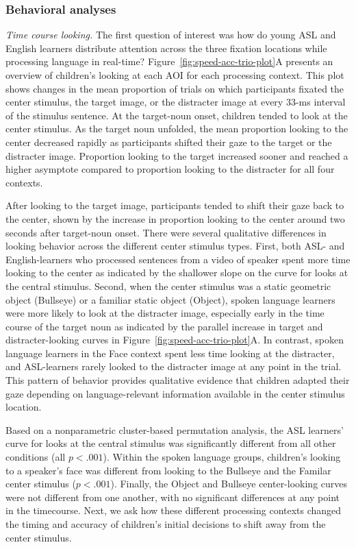 \documentclass[,man,floatsintext]{apa6}
\begin{document}
\hypertarget{behavioral-analyses}{%
\subsubsection{Behavioral analyses}\label{behavioral-analyses}}

\emph{Time course looking.} The first question of interest was how do young ASL and English learners distribute attention across the three fixation locations while processing language in real-time? Figure~\ref{fig:speed-acc-trio-plot}A presents an overview of children's looking at each AOI for each processing context. This plot shows changes in the mean proportion of trials on which participants fixated the center stimulus, the target image, or the distracter image at every 33-ms interval of the stimulus sentence. At the target-noun onset, children tended to look at the center stimulus. As the target noun unfolded, the mean proportion looking to the center decreased rapidly as participants shifted their gaze to the target or the distracter image. Proportion looking to the target increased sooner and reached a higher asymptote compared to proportion looking to the distracter for all four contexts.

After looking to the target image, participants tended to shift their gaze back to the center, shown by the increase in proportion looking to the center around two seconds after target-noun onset. There were several qualitative differences in looking behavior across the different center stimulus types. First, both ASL- and English-learners who processed sentences from a video of speaker spent more time looking to the center as indicated by the shallower slope on the curve for looks at the central stimulus. Second, when the center stimulus was a static geometric object (Bullseye) or a familiar static object (Object), spoken language learners were more likely to look at the distracter image, especially early in the time course of the target noun as indicated by the parallel increase in target and distracter-looking curves in Figure~\ref{fig:speed-acc-trio-plot}A. In contrast, spoken language learners in the Face context spent less time looking at the distracter, and ASL-learners rarely looked to the distracter image at any point in the trial. This pattern of behavior provides qualitative evidence that children adapted their gaze depending on language-relevant information available in the center stimulus location.

Based on a nonparametric cluster-based permutation analysis, the ASL learners' curve for looks at the central stimulus was significantly different from all other conditions (all \(p < .001\)). Within the spoken language groups, children's looking to a speaker's face was different from looking to the Bullseye and the Familar center stimulus (\(p < .001\)). Finally, the Object and Bullseye center-looking curves were not different from one another, with no significant differences at any point in the timecourse. Next, we ask how these different processing contexts changed the timing and accuracy of children's initial decisions to shift away from the center stimulus.
\end{document}
